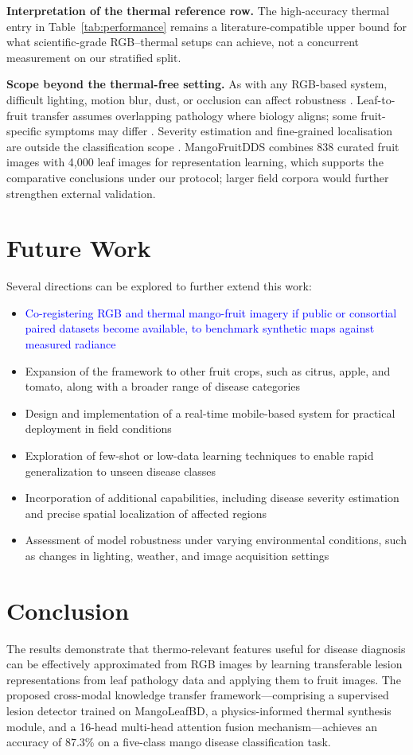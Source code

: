 \documentclass[utf8]{FrontiersinHarvard} %
\begin{document}
\textbf{Interpretation of the thermal reference row.} The high-accuracy thermal entry in Table~\ref{tab:performance} remains a literature-compatible upper bound for what scientific-grade RGB--thermal setups can achieve, not a concurrent measurement on our stratified split.

\textbf{Scope beyond the thermal-free setting.} As with any RGB-based system, difficult lighting, motion blur, dust, or occlusion can affect robustness \cite{kouidri2021}. Leaf-to-fruit transfer assumes overlapping pathology where biology aligns; some fruit-specific symptoms may differ \cite{weiss2016}. Severity estimation and fine-grained localisation are outside the classification scope \cite{wang2022_synthetic}. MangoFruitDDS combines 838 curated fruit images with 4{,}000 leaf images for representation learning, which supports the comparative conclusions under our protocol; larger field corpora would further strengthen external validation.
\endgroup

\section{Future Work}
Several directions can be explored to further extend this work:
\begin{itemize}
    \item \textcolor{blue}{Co-registering RGB and thermal mango-fruit imagery if public or consortial paired datasets become available, to benchmark synthetic maps against measured radiance}
    \item Expansion of the framework to other fruit crops, such as citrus, apple, and tomato, along with a broader range of disease categories
    \item Design and implementation of a real-time mobile-based system for practical deployment in field conditions
    \item Exploration of few-shot or low-data learning techniques to enable rapid generalization to unseen disease classes
    \item Incorporation of additional capabilities, including disease severity estimation and precise spatial localization of affected regions
    \item Assessment of model robustness under varying environmental conditions, such as changes in lighting, weather, and image acquisition settings
\end{itemize}

\FloatBarrier
\section{Conclusion}
The results demonstrate that thermo-relevant features useful for disease diagnosis can be effectively approximated from RGB images by learning transferable lesion representations from leaf pathology data and applying them to fruit images. The proposed cross-modal knowledge transfer framework—comprising a supervised lesion detector trained on MangoLeafBD, a physics-informed thermal synthesis module, and a 16-head multi-head attention fusion mechanism—achieves an accuracy of 87.3\% on a five-class mango disease classification task.
\end{document}

